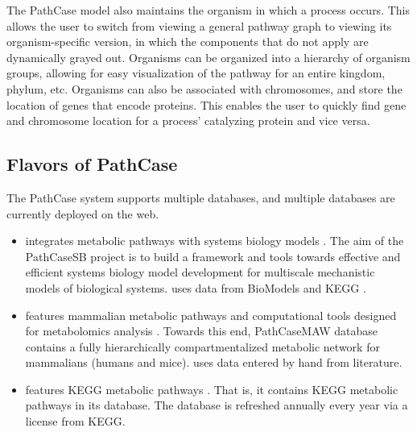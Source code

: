 The PathCase model also maintains the organism in which a process occurs.  This
allows the user to switch from viewing a general pathway graph to viewing its
organism-specific version, in which the components that do not apply are
dynamically grayed out. Organisms can be organized into a hierarchy of organism
groups, allowing for easy visualization of the pathway for an entire kingdom,
phylum, etc.  Organisms can also be associated with chromosomes, and store the
location of genes that encode proteins. This enables the user to quickly find
gene and chromosome location for a process’ catalyzing protein and vice versa.

\subsection{Flavors of PathCase}
\label{sect:pathcase_flavors}

The PathCase system supports multiple databases, and multiple databases are
currently deployed on the web.

\begin{itemize}

    \item \pathcasesb integrates metabolic pathways with systems biology models
        \cite{pathcase-basic}. The aim of the PathCaseSB project is to build a
        framework and tools towards effective and efficient systems biology
        model development for multiscale mechanistic models of biological
        systems. \pathcasesb uses data from BioModels and KEGG
        \cite{pathcase-basic}.

    \item \pathcasemaw features mammalian metabolic pathways and computational
        tools designed for metabolomics analysis \cite{pathcase-basic}. Towards
        this end, PathCaseMAW database contains a fully hierarchically
        compartmentalized metabolic network for mammalians (humans and mice).
        \pathcasemaw uses data entered by hand from literature.

    \item \pathcasekegg features KEGG metabolic pathways \cite{pathcase-basic}.
        That is, it contains KEGG metabolic pathways in its database. The
        \pathcasekegg database is refreshed annually every year via a license
        from KEGG.
        
\end{itemize}
